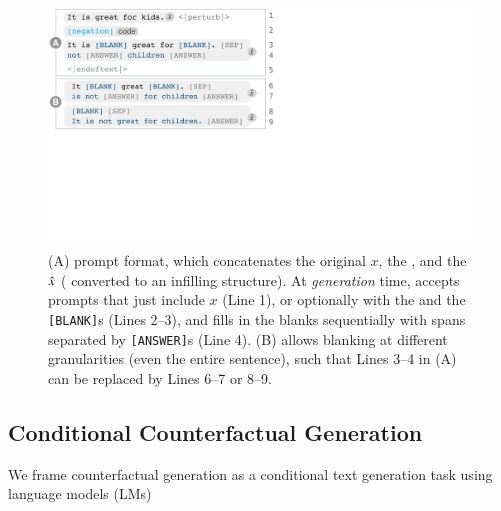 \begin{figure}[t]
\centering
\includegraphics[trim={0 18.6cm 31.5cm 0cm}, clip, width=1\columnwidth]{figures/blank.pdf}
\vspace{-15pt}
\caption{ 
(A) \sysname prompt format, which concatenates the original $x$, the \tagstr, and the $\hat{x}$ ( converted to an infilling structure).
At \emph{generation} time, \sysname accepts prompts that just include $x$ (Line 1), or optionally with the \tagstrshort and the \texttt{[BLANK]}s (Lines 2--3), and fills in the blanks sequentially with spans separated by \texttt{[ANSWER]}s (Line 4).
(B) \sysname allows blanking at different granularities (even the entire sentence), such that Lines 3--4 in (A) can be replaced by Lines 6--7 or 8--9. 
}
\vspace{-10pt}
\label{fig:blank}
\end{figure}


\subsection{Conditional Counterfactual Generation}
\label{subsec:nlg}




We frame counterfactual generation as a conditional text generation task using language models (LMs)


